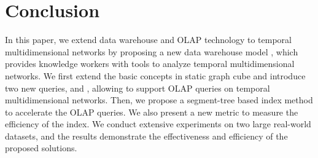 \documentclass[10pt,journal,compsoc]{IEEEtran}
\begin{document}
\section{Conclusion} \label{sec:conclusion}
In this paper, we extend data warehouse and OLAP technology to temporal multidimensional networks by proposing a new data warehouse model , which provides knowledge workers with tools to analyze temporal multidimensional networks. We first extend the basic concepts in static graph cube and introduce two new queries,  and , allowing  to support OLAP queries on temporal multidimensional networks. Then, we propose a segment-tree based index method to accelerate the OLAP queries. We also present a new metric to measure the efficiency of the index. We conduct extensive experiments on two large real-world datasets, and the results demonstrate the effectiveness and efficiency of the proposed solutions.





%
\end{document}
